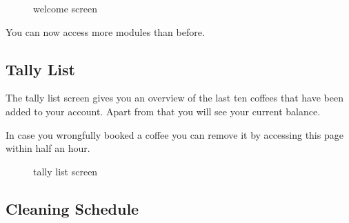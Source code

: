 \begin{figure}[htbp]
\centering
{}
\caption{welcome screen}
\end{figure}

You can now access more modules than before.

\subsection{Tally List}\label{tally-list-1}

The tally list screen gives you an overview of the last ten coffees that
have been added to your account. Apart from that you will see your
current balance.

In case you wrongfully booked a coffee you can remove it by accessing
this page within half an hour.

\begin{figure}[htbp]
\centering
{}
\caption{tally list screen}
\end{figure}

\subsection{Cleaning Schedule}\label{cleaning-schedule-1}

